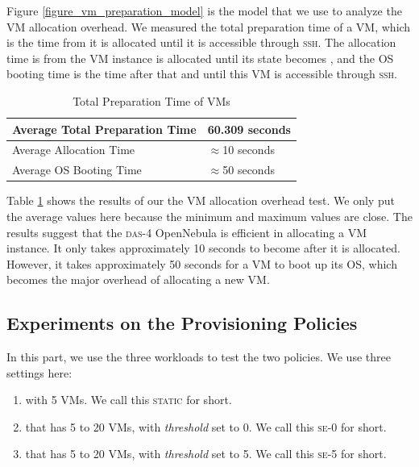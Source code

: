 Figure \ref{figure_vm_preparation_model} is the model that we use to analyze
the VM allocation overhead. We measured the total preparation time of a VM,
which is the time from it is allocated until it is accessible through
\textsc{ssh}. The allocation time is from the VM instance is
allocated until its state becomes \staterunning, and the OS booting time is
the time after that and until this VM is accessible through \textsc{ssh}.

\begin{table}
\caption{Total Preparation Time of VMs}
\label{table_vm_preparation}
\centering
\begin{tabular}{|l|l|}
\hline
Average Total Preparation Time & 60.309 seconds \\
\hline
Average Allocation Time & $\approx$10 seconds \\
\hline
Average OS Booting Time & $\approx$50 seconds \\
\hline
\end{tabular}
\end{table}

Table \ref{table_vm_preparation} shows the results of our the VM
allocation overhead test. We only put the average values here because
the minimum and maximum values are close. The results suggest that the
\textsc{das-4} OpenNebula is efficient in allocating a VM instance. It
only takes approximately 10 seconds to become \staterunning{} after it
is allocated. However, it takes approximately 50 seconds for a VM to
boot up its OS, which becomes the major overhead of allocating a new
VM.


\newcommand{\STATIC}{\textsc{static}}
\newcommand{\SE}{\textsc{se}}
\newcommand{\SEzero}{\textsc{se-0}}
\newcommand{\SEfive}{\textsc{se-5}}

\subsection{Experiments on the Provisioning Policies}
In this part, we use the three workloads to test the two policies. We
use three settings here:
\begin{enumerate}
\item \policystatic{} with 5 VMs. We call this \STATIC{} for short.
\item \policysimpleelastic{} that has 5 to 20 VMs, with \emph{threshold} set to 0. We call this \SEzero{} for short.
\item \policysimpleelastic{} that has 5 to 20 VMs, with \emph{threshold} set to 5. We call this \SEfive{} for short.
\end{enumerate}

